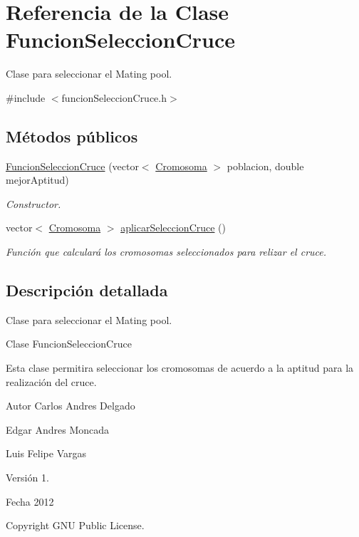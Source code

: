 \hypertarget{classFuncionSeleccionCruce}{\section{Referencia de la Clase Funcion\-Seleccion\-Cruce}
\label{classFuncionSeleccionCruce}
}


Clase para seleccionar el Mating pool.  




{\ttfamily \#include $<$funcion\-Seleccion\-Cruce.\-h$>$}

\subsection*{Métodos públicos}
\begin{DoxyCompactItemize}
\item 
\hyperlink{classFuncionSeleccionCruce_a22066e85dbf1ee971ff1433024ea3817}{Funcion\-Seleccion\-Cruce} (vector$<$ \hyperlink{classCromosoma}{Cromosoma} $>$ poblacion, double mejor\-Aptitud)
\begin{DoxyCompactList}\small\item\em Constructor. \end{DoxyCompactList}\item 
vector$<$ \hyperlink{classCromosoma}{Cromosoma} $>$ \hyperlink{classFuncionSeleccionCruce_a54ddbbce4b3bf60a646f28fab74b46e0}{aplicar\-Seleccion\-Cruce} ()
\begin{DoxyCompactList}\small\item\em Función que calculará los cromosomas seleccionados para relizar el cruce. \end{DoxyCompactList}\end{DoxyCompactItemize}


\subsection{Descripción detallada}
Clase para seleccionar el Mating pool. 

\begin{DoxyVerb}Clase FuncionSeleccionCruce
\end{DoxyVerb}


Esta clase permitira seleccionar los cromosomas de acuerdo a la aptitud para la realización del cruce. \begin{DoxyAuthor}{Autor}
Carlos Andres Delgado 

Edgar Andres Moncada 

Luis Felipe Vargas 
\end{DoxyAuthor}
\begin{DoxyVersion}{Versión}
1. 
\end{DoxyVersion}
\begin{DoxyDate}{Fecha}
2012 
\end{DoxyDate}
\begin{DoxyCopyright}{Copyright}
G\-N\-U Public License. 
\end{DoxyCopyright}



